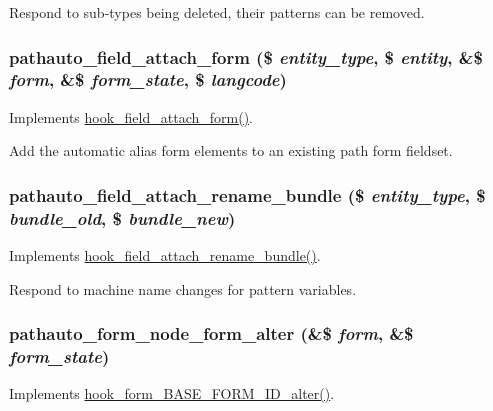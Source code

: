 Respond to sub-\/types being deleted, their patterns can be removed. \hypertarget{pathauto_8module_a5db998c6dbde2b0ccde267df64072f63}{
\subsubsection[{pathauto\_\-field\_\-attach\_\-form}]{\setlength{\rightskip}{0pt plus 5cm}pathauto\_\-field\_\-attach\_\-form (\$ {\em entity\_\-type}, \/  \$ {\em entity}, \/  \&\$ {\em form}, \/  \&\$ {\em form\_\-state}, \/  \$ {\em langcode})}}
\label{pathauto_8module_a5db998c6dbde2b0ccde267df64072f63}
Implements \hyperlink{group__field__attach_ga34b24a5a84763be5c6b9d214b1e81d93}{hook\_\-field\_\-attach\_\-form()}.

Add the automatic alias form elements to an existing path form fieldset. \hypertarget{pathauto_8module_a2a4e896ac2a2cadbef2fba1d848573c6}{
\subsubsection[{pathauto\_\-field\_\-attach\_\-rename\_\-bundle}]{\setlength{\rightskip}{0pt plus 5cm}pathauto\_\-field\_\-attach\_\-rename\_\-bundle (\$ {\em entity\_\-type}, \/  \$ {\em bundle\_\-old}, \/  \$ {\em bundle\_\-new})}}
\label{pathauto_8module_a2a4e896ac2a2cadbef2fba1d848573c6}
Implements \hyperlink{group__field__attach_gaf218d913150bda6004d5d8e112d3174a}{hook\_\-field\_\-attach\_\-rename\_\-bundle()}.

Respond to machine name changes for pattern variables. \hypertarget{pathauto_8module_acfdd05981fd465c6ed43d0670b02990b}{
\subsubsection[{pathauto\_\-form\_\-node\_\-form\_\-alter}]{\setlength{\rightskip}{0pt plus 5cm}pathauto\_\-form\_\-node\_\-form\_\-alter (\&\$ {\em form}, \/  \&\$ {\em form\_\-state})}}
\label{pathauto_8module_acfdd05981fd465c6ed43d0670b02990b}
Implements \hyperlink{group__hooks_gaf0cfc224a88c8823da68856c30a4841a}{hook\_\-form\_\-BASE\_\-FORM\_\-ID\_\-alter()}.

